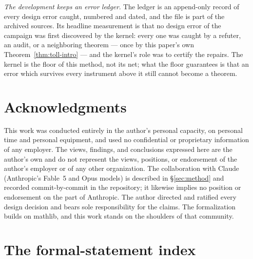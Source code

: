 \documentclass[11pt]{amsart}
\theoremstyle{remark}
\begin{document}
\emph{The development keeps an error ledger.} The ledger is an
append-only record of every design error caught, numbered and dated,
and the file is part of the archived sources. Its headline measurement
is that no design error of the campaign was first discovered by the
kernel: every one was caught by a refuter, an audit, or a neighboring
theorem --- once by this paper's own Theorem~\ref{thm:toll-intro} ---
and the kernel's role was to certify the repairs. The kernel is the
floor of this method, not its net; what the floor guarantees is that an
error which survives every instrument above it still cannot become a
theorem.

\section*{Acknowledgments}
This work was conducted entirely in the author's personal capacity, on
personal time and personal equipment, and used no confidential or
proprietary information of any employer. The views, findings, and
conclusions expressed here are the author's own and do not represent
the views, positions, or endorsement of the author's employer or of any
other organization. The collaboration with Claude (Anthropic's Fable~5
and Opus models) is described in \S\ref{sec:method} and recorded
commit-by-commit in the repository; it likewise implies no position or
endorsement on the part of Anthropic. The author directed and ratified
every design decision and bears sole responsibility for the claims. The
formalization builds on \textsf{mathlib}, and this work stands on the
shoulders of that community.

\appendix
\section{The formal-statement index}\label{app:index}
\end{document}
